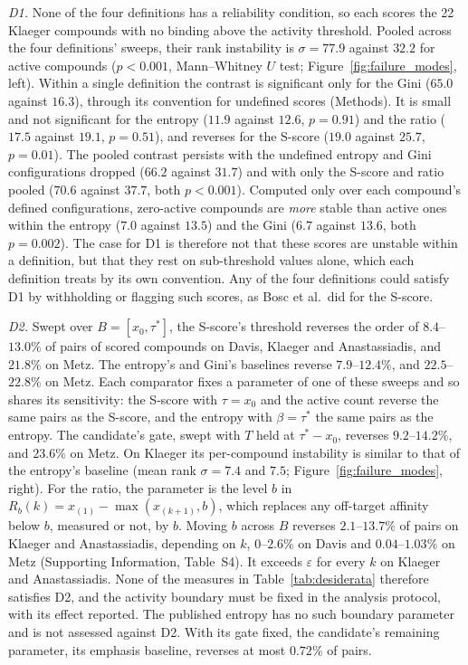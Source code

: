 \textit{D1.} None of the four definitions has a reliability condition, so each
scores the 22 Klaeger compounds with no binding above the activity threshold.
Pooled across the four definitions' sweeps, their rank instability is
$\sigma = 77.9$ against $32.2$ for active compounds ($p < 0.001$, Mann--Whitney
$U$ test; Figure~\ref{fig:failure_modes}, left). Within a single definition the
contrast is significant only for the Gini ($65.0$ against $16.3$), through its
convention for undefined scores (Methods). It is small and not significant for
the entropy ($11.9$ against $12.6$, $p = 0.91$) and the ratio ($17.5$ against
$19.1$, $p = 0.51$), and reverses for the S-score ($19.0$ against $25.7$,
$p = 0.01$). The pooled contrast persists with the undefined entropy and Gini
configurations dropped ($66.2$ against $31.7$) and with only the S-score and
ratio pooled ($70.6$ against $37.7$, both $p < 0.001$). Computed only over each
compound's defined configurations, zero-active compounds are \emph{more}
stable than active ones within the entropy ($7.0$ against $13.5$) and the Gini
($6.7$ against $13.6$, both $p = 0.002$). The case for D1 is therefore not that
these scores are unstable within a definition, but that they rest on
sub-threshold values alone, which each definition treats by its own
convention. Any of the four definitions could satisfy D1 by withholding or
flagging such scores, as Bosc et al.\ did for the S-score.

\textit{D2.} Swept over $B = [x_0, \tau^*]$, the S-score's threshold reverses
the order of $8.4$--$13.0\%$ of pairs of scored compounds on Davis, Klaeger and
Anastassiadis, and $21.8\%$ on Metz. The entropy's and Gini's baselines reverse
$7.9$--$12.4\%$, and $22.5$--$22.8\%$ on Metz. Each comparator fixes a
parameter of one of these sweeps and so shares its sensitivity: the S-score with
$\tau = x_0$ and the active count reverse the same pairs as the S-score, and the
entropy with $\beta = \tau^*$ the same pairs as the entropy. The candidate's
gate, swept with $T$ held at $\tau^* - x_0$, reverses $9.2$--$14.2\%$, and
$23.6\%$ on Metz. On Klaeger its per-compound instability is similar to that of the
entropy's baseline (mean rank $\sigma = 7.4$ and $7.5$;
Figure~\ref{fig:failure_modes}, right). For the ratio, the parameter is the
level $b$ in $R_b(k) = x_{(1)} - \max(x_{(k+1)}, b)$, which replaces any
off-target affinity below $b$, measured or not, by $b$. Moving $b$ across $B$
reverses $2.1$--$13.7\%$ of pairs on Klaeger and Anastassiadis, depending on
$k$, $0$--$2.6\%$ on Davis and $0.04$--$1.03\%$ on Metz (Supporting
Information, Table~S4). It exceeds $\varepsilon$ for every $k$ on Klaeger and
Anastassiadis. None of the measures in Table~\ref{tab:desiderata} therefore
satisfies D2, and the activity boundary must be fixed in the analysis protocol,
with its effect reported. The published entropy has no such boundary parameter
and is not assessed against D2. With its gate fixed,
the candidate's remaining parameter, its emphasis baseline, reverses at most
$0.72\%$ of pairs.


